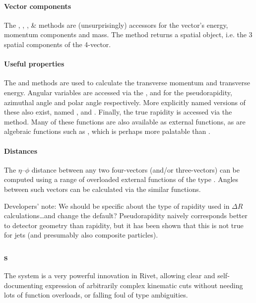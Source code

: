 \paragraph{Vector components}%
The  , , ,  \&
 methods are (unsurprisingly) accessors for the vector's energy,
momentum components and mass. The  method returns a spatial
 object, i.e. the 3 spatial components of the 4-vector.

\paragraph{Useful properties}%
The  and  methods are used to calculate the transverse
momentum and transverse energy. Angular variables are accessed via the
,  and  for the pseudorapidity, azimuthal
angle and polar angle respectively. More explicitly named versions of these also
exist, named ,  and
. Finally, the true rapidity is accessed via the
 method. Many of these functions are also available as external
functions, as are algebraic functions such as , which
is perhaps more palatable than .

\paragraph{Distances}%
The $\eta$--$\phi$ distance between any two four-vectors (and/or three-vectors)
can be computed using a range of overloaded external functions of the type
. Angles between such vectors can be calculated via the
similar  functions.

\begin{warning}
  Developers' note: We should be specific about the type of rapidity used in
  $\Delta{R}$ calculations\dots and change the default? Pseudorapidity naively
  corresponds better to detector geometry than rapidity, but it has been shown
  that this is not true for jets (and presumably also composite particles).
\end{warning}

\subsubsection{s}
The  system is a very powerful innovation in Rivet, allowing clear and
self-documenting expression of arbitrarily complex kinematic cuts without
needing lots of function overloads, or falling foul of type ambiguities.

